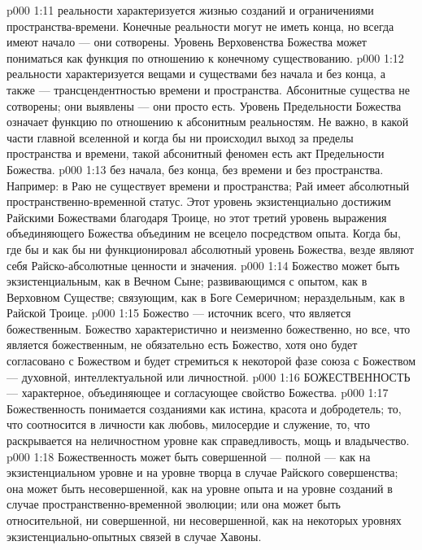\vs p000 1:11 \pc {} реальности характеризуется жизнью созданий и ограничениями пространства\hyp{}времени. Конечные реальности могут не иметь конца, но всегда имеют начало --- они сотворены. Уровень Верховенства Божества может пониматься как функция по отношению к конечному существованию.
\vs p000 1:12 \pc {} реальности характеризуется вещами и существами без начала и без конца, а также --- трансцендентностью времени и пространства. Абсонитные существа не сотворены; они выявлены --- они просто есть. Уровень Предельности Божества означает функцию по отношению к абсонитным реальностям. Не важно, в какой части главной вселенной и когда бы ни происходил выход за пределы пространства и времени, такой абсонитный феномен есть акт Предельности Божества.
\vs p000 1:13 \pc {} без начала, без конца, без времени и без пространства. Например: в Раю не существует времени и пространства; Рай имеет абсолютный пространственно\hyp{}временной статус. Этот уровень экзистенциально достижим Райскими Божествами благодаря Троице, но этот третий уровень выражения объединяющего Божества объединим не всецело посредством опыта. Когда бы, где бы и как бы ни функционировал абсолютный уровень Божества, везде являют себя Райско\hyp{}абсолютные ценности и значения.
\vs p000 1:14 \pc Божество может быть экзистенциальным, как в Вечном Сыне; развивающимся с опытом, как в Верховном Существе; связующим, как в Боге Семеричном; нераздельным, как в Райской Троице.
\vs p000 1:15 Божество --- источник всего, что является божественным. Божество характеристично и неизменно божественно, но все, что является божественным, не обязательно есть Божество, хотя оно будет согласовано с Божеством и будет стремиться к некоторой фазе союза с Божеством --- духовной, интеллектуальной или личностной.
\vs p000 1:16 \pc БОЖЕСТВЕННОСТЬ --- характерное, объединяющее и согласующее свойство Божества.
\vs p000 1:17 Божественность понимается созданиями как истина, красота и добродетель; то, что соотносится в личности как любовь, милосердие и служение, то, что раскрывается на неличностном уровне как справедливость, мощь и владычество.
\vs p000 1:18 Божественность может быть совершенной --- полной --- как на экзистенциальном уровне и на уровне творца в случае Райского совершенства; она может быть несовершенной, как на уровне опыта и на уровне созданий в случае пространственно\hyp{}временной эволюции; или она может быть относительной, ни совершенной, ни несовершенной, как на некоторых уровнях экзистенциально\hyp{}опытных связей в случае Хавоны.
